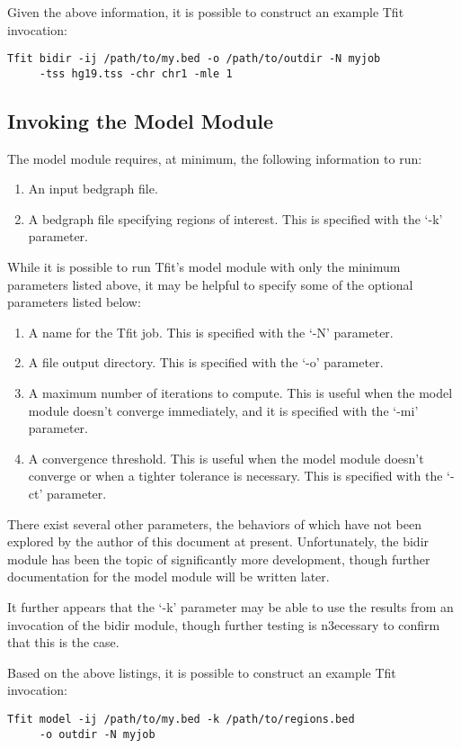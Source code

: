 \documentclass[12pt,letterpaper]{article}
\begin{document}
Given the above information, it is possible to construct an example Tfit invocation:
\begin{verbatim}
Tfit bidir -ij /path/to/my.bed -o /path/to/outdir -N myjob 
     -tss hg19.tss -chr chr1 -mle 1
\end{verbatim}

\subsection{Invoking the Model Module}
The model module requires, at minimum, the following information to run:
\begin{enumerate}
\item An input bedgraph file.
\item A bedgraph file specifying regions of interest. This is specified with the `-k' parameter.
\end{enumerate}

While it is possible to run Tfit's model module with only the minimum parameters listed above, it may be helpful to specify some of the optional parameters listed below:

\begin{enumerate}
\item A name for the Tfit job. This is specified with the `-N' parameter.
\item A file output directory. This is specified with the `-o' parameter.
\item A maximum number of iterations to compute. This is useful when the model module doesn't converge immediately, and it is specified with the `-mi' parameter.
\item A convergence threshold. This is useful when the model module doesn't converge or when a tighter tolerance is necessary. This is specified with the `-ct' parameter.
\end{enumerate}

There exist several other parameters, the behaviors of which have not been explored by the author of this document at present. Unfortunately, the bidir module has been the topic of significantly more development, though further documentation for the model module will be written later. 

It further appears that the `-k' parameter may be able to use the results from an invocation of the bidir module, though further testing is n3ecessary to confirm that this is the case.

Based on the above listings, it is possible to construct an example Tfit invocation:
\begin{verbatim}
Tfit model -ij /path/to/my.bed -k /path/to/regions.bed 
     -o outdir -N myjob
\end{verbatim}
\end{document}
